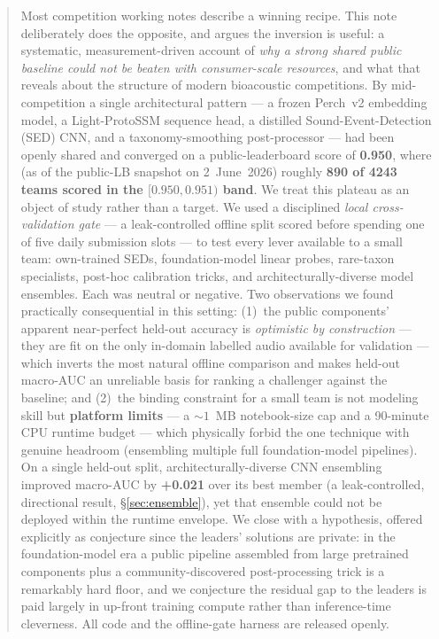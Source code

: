 \documentclass{ceurart}
\begin{document}
\begin{abstract}
Most competition working notes describe a winning recipe. This note deliberately
does the opposite, and argues the inversion is useful: a systematic,
measurement-driven account of \emph{why a strong shared public baseline could not
be beaten with consumer-scale resources}, and what that reveals about the
structure of modern bioacoustic competitions. By mid-competition a single
architectural pattern --- a frozen Perch~v2 embedding model, a Light-ProtoSSM
sequence head, a distilled Sound-Event-Detection (SED) CNN, and a
taxonomy-smoothing post-processor --- had been openly shared and converged on a
public-leaderboard score of \textbf{0.950}, where (as of the public-LB snapshot
on 2~June~2026) roughly \textbf{890 of 4243 teams scored in the
$[0.950, 0.951)$ band}. We treat this plateau as an object of study rather than a
target. We used a disciplined \emph{local cross-validation gate} --- a
leak-controlled offline split scored before spending one of five daily submission
slots --- to test every lever available to a small team: own-trained SEDs,
foundation-model linear probes, rare-taxon specialists, post-hoc calibration
tricks, and architecturally-diverse model ensembles. Each was neutral or negative.
Two observations we found practically consequential in this setting: (1)~the public
components' apparent near-perfect held-out accuracy is \emph{optimistic by
construction} --- they are fit on the only in-domain labelled audio available for
validation --- which inverts the most natural offline comparison and makes held-out
macro-AUC an unreliable basis for ranking a challenger against the baseline; and
(2)~the binding constraint for a small team is not modeling skill but
\textbf{platform limits} --- a ${\sim}1$~MB notebook-size cap and a 90-minute CPU
runtime budget --- which physically forbid the one technique with genuine headroom
(ensembling multiple full foundation-model pipelines). On a single held-out split,
architecturally-diverse CNN ensembling improved macro-AUC by \textbf{+0.021} over
its best member (a leak-controlled, directional result, \S\ref{sec:ensemble}),
yet that ensemble could not be deployed within the runtime envelope. We close
with a hypothesis, offered explicitly as conjecture since the leaders' solutions
are private: in the foundation-model era a public pipeline assembled from large
pretrained components plus a community-discovered post-processing trick is a
remarkably hard floor, and we conjecture the residual gap to the leaders is paid
largely in up-front training compute rather than inference-time cleverness. All
code and the offline-gate harness are released openly.
\end{abstract}
\end{document}
